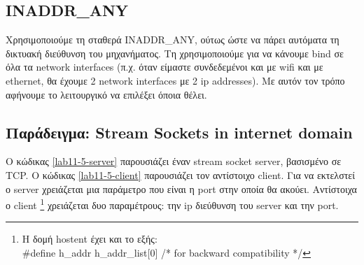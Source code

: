 



%

\subsection*{INADDR\_ANY}
Χρησιμοποιούμε τη σταθερά INADDR\_ANY, ούτως ώστε να πάρει αυτόματα τη δικτυακή διεύθυνση του μηχανήματος. Τη χρησιμοποιούμε για να κάνουμε bind σε όλα τα network interfaces (π.χ. όταν είμαστε συνδεδεμένοι και με wifi και με ethernet, θα έχουμε 2 network interfaces με 2 ip addresses).
Με αυτόν τον τρόπο αφήνουμε το λειτουργικό να επιλέξει όποια θέλει.




\subsection*{Παράδειγμα: Stream Sockets in internet domain}


Ο κώδικας \ref{lab11-5-server} παρουσιάζει έναν stream socket server, βασισμένο σε TCP. Ο κώδικας \ref{lab11-5-client} παρουσιάζει τον αντίστοιχο client. Για να εκτελστεί ο server χρειάζεται μια παράμετρο που είναι η port στην οποία θα ακούει. Αντίστοιχα ο client \footnote{Η δομή hostent έχει και το εξής:\\  \#define h\_addr  h\_addr\_list[0]  /* for backward compatibility */} χρειάζεται δυο παραμέτρους: την ip διεύθυνση του server και την port.



%







%



